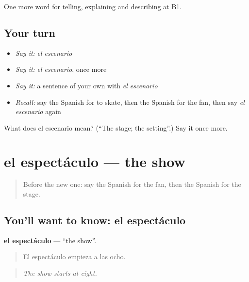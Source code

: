 \begin{grammarlens}[title={What you've built}]
One more word for telling, explaining and describing at B1.
\end{grammarlens}

\subsection*{Your turn}
\begin{itemize}
\raggedright
  \item \emph{Say it:} \emph{el escenario}
  \item \emph{Say it:} \emph{el escenario}, once more
  \item \emph{Say it:} a sentence of your own with \emph{el escenario}
  \item \emph{Recall:} say the Spanish for to skate, then the Spanish for the fan, then say \emph{el escenario} again
\end{itemize}

\begin{tcolorbox}[breakable,colback=teal!4,colframe=teal!35!black,title={Before you move on}]
What does el escenario mean? (\textquotedblleft{}The stage; the setting\textquotedblright{}.) Say it once more.
\end{tcolorbox}
\section[el espectáculo]{el espectáculo — the show}

\label{lesson:ES-C759-espectaculo}



\begin{quote}
Before the new one: say the Spanish for the fan, then the Spanish for the stage.
\end{quote}

\subsection*{You'll want to know: el espectáculo}
\textbf{el espectáculo} — \textquotedblleft{}the show\textquotedblright{}.

\begin{quote}
El espectáculo empieza a las ocho.
\end{quote}

\begin{quote}
\emph{The show starts at eight.}
\end{quote}

